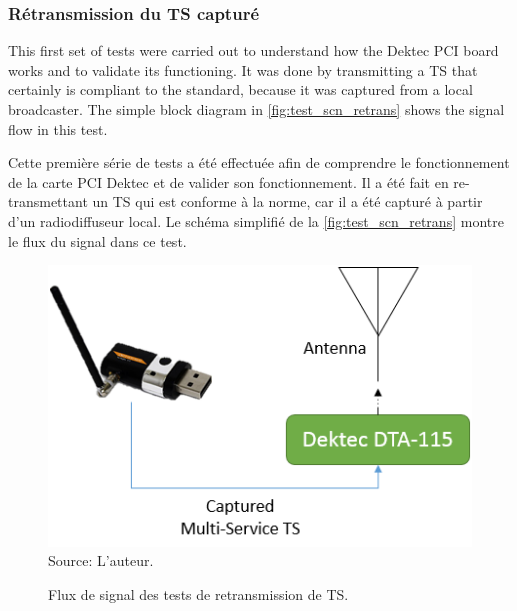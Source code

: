 \documentclass[12pt,a4paper]{article}
\begin{document}
\subsubsection{Rétransmission du TS capturé}
\label{retransmitting}

This first set of tests were carried out to understand how the Dektec PCI board works and to validate its functioning. It was done by transmitting a TS that certainly is compliant to the standard, because it was captured from a local broadcaster. The simple block diagram in \autoref{fig:test_scn_retrans} shows the signal flow in this test.

Cette première série de tests a été effectuée afin de comprendre le fonctionnement de la carte PCI Dektec et de valider son fonctionnement. Il a été fait en re-transmettant un TS qui est conforme à la norme, car il a été capturé à partir d'un radiodiffuseur local. Le schéma simplifié de la \autoref{fig:test_scn_retrans} montre le flux du signal dans ce test.

\begin{figure}[!h]
\centering
\caption{Flux de signal des tests de retransmission de TS.}
\includegraphics[width=0.5\linewidth]{pictures/test_scn_retrans.png}
\\Source: L'auteur.
\label{fig:test_scn_retrans}
\end{figure}


\end{document}
